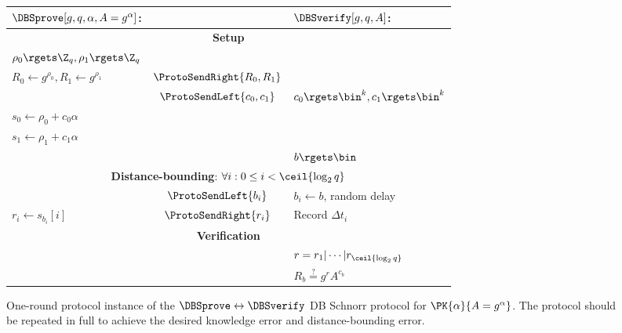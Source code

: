 \begin{figure*}
  \centering
  \begin{tabular}{lcl}
    \(\DBSprove[g, q, \alpha, A = g^\alpha]\):
    & &
    \(\DBSverify[g, q, A]\):
    \\
    \toprule

    \multicolumn{3}{c}{\textbf{Setup}} \\

    \(\rho_0\rgets \Z_q, \rho_1\rgets \Z_q\)
    &
    &
    \\

    \(R_0\gets g^{\rho_0}, R_1\gets g^{\rho_1}\)
    & \(\ProtoSendRight{R_0, R_1}\)
    &
    \\

    & \(\ProtoSendLeft{c_0, c_1}\)
    & \(c_0\rgets \bin^k, c_1\rgets \bin^k\)
    \\

    \(s_0\gets \rho_0 + c_0\alpha\)
    &
    &
    \\

    \(s_1\gets \rho_1 + c_1\alpha\)
    &
    &
    \\

    &
    & \(b\rgets \bin\)
    \\

    \midrule
    \multicolumn{3}{c}{\textbf{Distance-bounding}: \(\forall i: 0\leq i < 
        \ceil{\log_2 q}\)} \\


    & \(\ProtoSendLeft{b_i}\)
    & \(b_i\gets b\), random delay \\

    \(r_i\gets s_{b_i}[i]\)
    & \(\ProtoSendRight{r_i}\)
    & Record \(\Delta t_i\)
    \\

    \midrule
    \multicolumn{3}{c}{\textbf{Verification}}
    \\

    &
    & \(r = r_1|\dotsb|r_{\ceil{\log_2 q}}\)
    \\

    &
    & \(R_b \stackrel{?}{=} g^r A^{c_b}\)
    \\
    
    \bottomrule
  \end{tabular}
  \caption{%
    One-round protocol instance of the \(\DBSprove\leftrightarrow \DBSverify\) 
    \ac{DB} Schnorr protocol for \(\PK{\alpha}{A = g^\alpha}\).
    The protocol should be repeated in full to achieve the desired knowledge 
    error and distance-bounding error.
  }%
  \label{SchnorrFigure}
\end{figure*}

